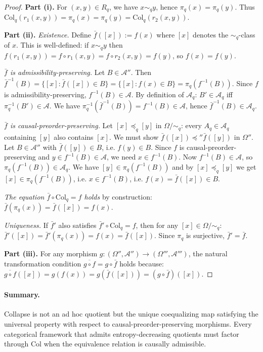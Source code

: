 \documentclass[12pt,a4paper]{article}
\theoremstyle{definition}
\theoremstyle{remark}
\newcommand{\Col}{\mathrm{Col}}
\begin{document}
\begin{proof}
\textbf{Part (i).} For $(x,y)\in R_q$, we have $x\sim_q y$, hence
$\pi_q(x)=\pi_q(y)$. Thus $\Col_q(r_1(x,y))=\pi_q(x)=\pi_q(y)=\Col_q(r_2(x,y))$.

\textbf{Part (ii).} \textit{Existence.} Define $\bar{f}([x]):=f(x)$ where $[x]$
denotes the $\sim_q$-class of $x$. This is well-defined: if $x\sim_q y$ then
$f(r_1(x,y))=f\circ r_1(x,y)=f\circ r_2(x,y)=f(y)$, so $f(x)=f(y)$.

\textit{$\bar{f}$ is admissibility-preserving.} Let $B\in\mathcal{A}''$. Then
$\bar{f}^{-1}(B)=\{[x]:\bar{f}([x])\in B\}=\{[x]:f(x)\in B\}=\pi_q(f^{-1}(B))$.
Since $f$ is admissibility-preserving, $f^{-1}(B)\in\mathcal{A}$. By definition of
$\mathcal{A}_q$: $B'\in\mathcal{A}_q$ iff $\pi_q^{-1}(B')\in\mathcal{A}$. We have
$\pi_q^{-1}(\bar{f}^{-1}(B))=f^{-1}(B)\in\mathcal{A}$, hence $\bar{f}^{-1}(B)\in
\mathcal{A}_q$.

\textit{$\bar{f}$ is causal-preorder-preserving.} Let $[x]\preceq_{q}[y]$ in
$\Omega/{\sim_q}$: every $A_q\in\mathcal{A}_q$ containing $[y]$ also contains $[x]$.
We must show $\bar{f}([x])\preceq''\bar{f}([y])$ in $\Omega''$. Let $B\in\mathcal{A}''$
with $\bar{f}([y])\in B$, i.e. $f(y)\in B$. Since $f$ is causal-preorder-preserving
and $y\in f^{-1}(B)\in\mathcal{A}$, we need $x\in f^{-1}(B)$. Now
$f^{-1}(B)\in\mathcal{A}$, so $\pi_q(f^{-1}(B))\in\mathcal{A}_q$. We have
$[y]\in\pi_q(f^{-1}(B))$ and by $[x]\preceq_q[y]$ we get $[x]\in\pi_q(f^{-1}(B))$,
i.e. $x\in f^{-1}(B)$, i.e. $f(x)=\bar{f}([x])\in B$.

\textit{The equation $\bar{f}\circ\Col_q=f$ holds} by construction: $\bar{f}(\pi_q(x))
=\bar{f}([x])=f(x)$.

\textit{Uniqueness.} If $\bar{f}'$ also satisfies $\bar{f}'\circ\Col_q=f$, then for
any $[x]\in\Omega/{\sim_q}$: $\bar{f}'([x])=\bar{f}'(\pi_q(x))=f(x)=\bar{f}([x])$.
Since $\pi_q$ is surjective, $\bar{f}'=\bar{f}$.

\textbf{Part (iii).} For any morphism $g:(\Omega'',\mathcal{A}'')\to
(\Omega''',\mathcal{A}''')$, the natural transformation condition
$\overline{g\circ f}=g\circ\bar{f}$ holds because:
$\overline{g\circ f}([x])=g(f(x))=g(\bar{f}([x]))=(g\circ\bar{f})([x])$.
\end{proof}

\paragraph{Summary.} Collapse is not an ad hoc quotient but the unique coequalizing
map satisfying the universal property with respect to causal-preorder-preserving morphisms.
Every categorical framework that admits entropy-decreasing quotients must factor through
$\Col$ when the equivalence relation is causally admissible.
\end{document}
